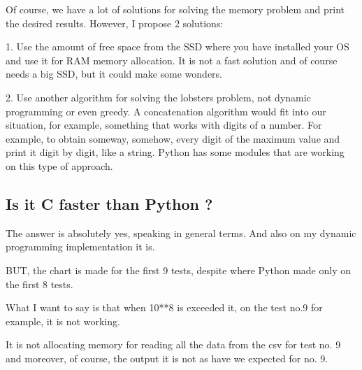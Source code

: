 \documentclass{article}%
\begin{document}
                        

\vspace{0.3cm}


            Of course, we have a lot of solutions for solving the memory problem and print the desired results.
            However, I propose 2 solutions:
\vspace{0.3cm}
                        

            1. Use the amount of free space from the SSD where you have installed your OS and use it for RAM memory allocation.
            It is not a fast solution and of course needs a big SSD, but it could make some wonders.
\vspace{0.2cm}
                        



            2. Use another algorithm for solving the lobsters problem, not dynamic programming or even greedy.
            A concatenation algorithm would fit into our situation, for example, something that works with digits of a number.
            For example, to obtain someway, somehow, every digit of the maximum value and print it digit by digit, like a string.
            Python has some modules that are working on this type of approach.
            
            
                        \vspace*{\fill}
\newpage%


    \vspace*{\fill}

    
    \subsection{Is it C faster than Python ?}

                                   
    \vspace{1cm}
                        
    The answer is absolutely yes, speaking in general terms. And also on my dynamic programming implementation it is. 
                        

    BUT, the chart is made for the first 9 tests, despite where Python made only on the first 8 tests.
                        
                    
    What I want to say is that when 10**8 is exceeded it, on the test no.9 for example, it is not working.
                        

    It is not allocating memory for reading all the data from the csv for test no. 9 and moreover, of course, the output it is not as have we expected for no. 9.
    
\end{document}
